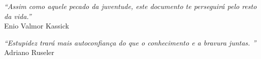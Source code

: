 


\begin{epigrafe}

\vspace*{\fill}
    \begin{flushright}
        \textit{``Assim como aquele pecado da juventude, este documento te perseguirá pelo resto da vida.''} \\ Enio Valmor Kassick
    \end{flushright}
    \begin{flushright}
        \textit{``Estupidez trará mais autoconfiança do que o conhecimento e a bravura juntas. \englishword{\showfont}''} \\ Adriano Ruseler
    \end{flushright}


\end{epigrafe}


